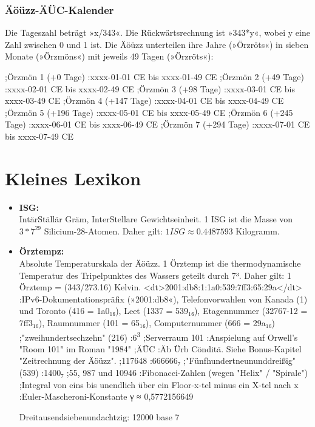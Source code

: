 \subsection{Äöüzz-ÄÜC-Kalender}

Die Tageszahl beträgt »x/343«. Die Rückwärtsrechnung ist »343*y«, wobei y eine Zahl zwischen 0 und 1 ist. Die Äöüzz unterteilen ihre Jahre (»Örzröts«) in sieben Monate (»Örzmöns«) mit jeweils 49 Tagen (»Örzröts«):

;Örzmön 1 (+0 Tage)
:xxxx-01-01 CE bis xxxx-01-49 CE
;Örzmön 2 (+49 Tage)
:xxxx-02-01 CE bis xxxx-02-49 CE
;Örzmön 3 (+98 Tage)
:xxxx-03-01 CE bis xxxx-03-49 CE
;Örzmön 4 (+147 Tage)
:xxxx-04-01 CE bis xxxx-04-49 CE
;Örzmön 5 (+196 Tage)
:xxxx-05-01 CE bis xxxx-05-49 CE
;Örzmön 6 (+245 Tage)
:xxxx-06-01 CE bis xxxx-06-49 CE
;Örzmön 7 (+294 Tage)
:xxxx-07-01 CE bis xxxx-07-49 CE



\chapter{Kleines Lexikon}

\begin{itemize}
    \item \textbf{ISG:}\\ IntärStällär Gräm, InterStellare Gewichtseinheit. 1 ISG ist die Masse von $3*7^{29}$ Silicium-28-Atomen. Daher gilt: $1 ISG ≈ 0.4487593$ Kilogramm.
    \item \textbf{Örztempz:}\\ Absolute Temperaturskala der Äöüzz. 1 Örztemp ist die thermodynamische Temperatur des Tripelpunktes des Wassers geteilt durch 7³. Daher gilt: 1 Örztemp = (343/273.16) Kelvin.
<dt>2001:db8:1:1a0:539:7ff3:65:29a</dt>
:IPv6-Dokumentationspräfix (»2001:db8«), Telefonvorwahlen von Kanada (1) und Toronto (416 = 1a0₁₆), Leet (1337 = 539₁₆), Etagennummer (32767-12 = 7ff3₁₆), Raumnummer (101 = 65₁₆), Computernummer (666 = 29a₁₆)
;"zweihundertsechzehn" (216)
:6\textsuperscript{3}
;Serverraum 101
:Anspielung auf Orwell's "Room 101" im Roman "1984"
;ÄÜC
:Äb Ürb Cönditä. Siehe Bonus-Kapitel "Zeitrechnung der Äöüzz".
;117648
:666666₇
;"Fünfhundertneununddreißig" (539)
:1400₇
;55, 987 und 10946
:Fibonacci-Zahlen (wegen "Helix" / "Spirale")
;Integral von eins bis unendlich über ein Floor-x-tel minus ein X-tel nach x
:Euler-Mascheroni-Konstante γ ≈ 0,5772156649

Dreitausendsiebenundachtzig: 12000 base 7

\end{itemize}



